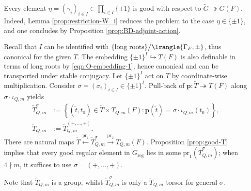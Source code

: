 \documentclass[a4paper,10pt]{article}
\begin{document}
\begin{remark}\label{rem:good-pm1}
	Every element $\eta = (\gamma_i)_{i \in I} \in \prod_{i \in I} \{\pm 1\}$ is good with respect to $\tilde{G} \twoheadrightarrow G(F)$. Indeed, Lemma \ref{prop:restriction-W_i} reduces the problem to the case $\eta \in \{\pm 1\}$, and one concludes by Proposition \ref{prop:BD-adjoint-action}.
\end{remark}

\begin{notation}
	Recall that $I$ can be identified with $\{ \text{long roots} \} \big/ \lrangle{\Gamma_F, \pm}$, thus canonical for the given $T$. The embedding $\{\pm 1\}^I \hookrightarrow T(F)$ is also definable in terms of long roots by \eqref{eqn:O-embedding-1}, hence canonical and can be transported under stable conjugacy. Let $\{\pm 1\}^I$ act on $T$ by coordinate-wise multiplication. Consider $\sigma = (\sigma_i)_{i \in I} \in \{\pm 1\}^I$. Pull-back of $\bm{p}: \tilde{T} \twoheadrightarrow T(F)$ along $\sigma \cdot \iota_{Q,m}$ yields
	\begin{equation}\label{eqn:iota-cover}\begin{aligned}
		\tilde{T}^\sigma_{Q,m} & := \left\{ (\tilde{t}, t_0) \in \tilde{T} \times T_{Q,m}(F) : \bm{p}(\tilde{t}) = \sigma \cdot \iota_{Q,m}(t_0) \right\}, \\
		\tilde{T}_{Q,m} & := \tilde{T}^{(+, \ldots, +)}_{Q,m}.
	\end{aligned}\end{equation}
	There are natural maps $\tilde{T} \xleftarrow{\text{pr}_1} \tilde{T}^\sigma_{Q,m} \xrightarrow{\text{pr}_2} T_{Q,m}(F)$. Proposition \ref{prop:good-T} implies that every good regular element in $\tilde{G}_\text{reg}$ lies in some $\text{pr}_1\left(\tilde{T}^\sigma_{Q,m}\right)$; when $4 \nmid m$, it suffices to use $\sigma = (+, \ldots, +)$.
\end{notation}

Note that $\tilde{T}_{Q,m}$ is a group, whilst $\tilde{T}^\sigma_{Q,m}$ is only a $\tilde{T}_{Q,m}$-torsor for general $\sigma$.
\end{document}
